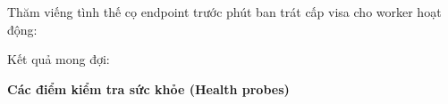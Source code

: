 Thăm viếng tình thế cọ endpoint trước phút ban trát cấp visa cho worker
hoạt động:

\begin{Shaded}
\begin{Highlighting}[]
\DataTypeTok{\textbackslash{}}
  \DataTypeTok{\textbackslash{}}
  \DataTypeTok{\textbackslash{}}
  \DataTypeTok{\textbackslash{}}
\end{Highlighting}
\end{Shaded}

Kết quả mong đợi:

\begin{Shaded}
\begin{Highlighting}[]
\end{Highlighting}
\end{Shaded}

\vspace{0.5em}\noindent\textbf{Các điểm kiểm tra sức khỏe (Health
probes)}\par

